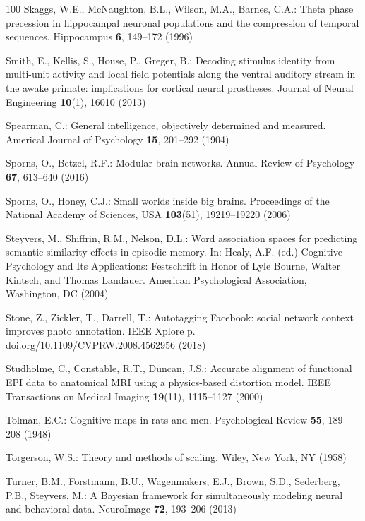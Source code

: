 \documentclass[runningheads]{llncs}
\begin{document}
\begin{thebibliography}{100}
Skaggs, W.E., Mc{N}aughton, B.L., Wilson, M.A., Barnes, C.A.: Theta phase
  precession in hippocampal neuronal populations and the compression of
  temporal sequences. Hippocampus  \textbf{6},  149--172 (1996)

Smith, E., Kellis, S., House, P., Greger, B.: Decoding stimulus identity from
  multi-unit activity and local field potentials along the ventral auditory
  stream in the awake primate: implications for cortical neural prostheses.
  Journal of Neural Engineering  \textbf{10}(1),  16010 (2013)

Spearman, C.: General intelligence, objectively determined and measured.
  Americal Journal of Psychology  \textbf{15},  201--292 (1904)

Sporns, O., Betzel, R.F.: Modular brain networks. Annual Review of Psychology
  \textbf{67},  613--640 (2016)

Sporns, O., Honey, C.J.: Small worlds inside big brains. Proceedings of the
  National Academy of Sciences, {USA}  \textbf{103}(51),  19219--19220 (2006)

Steyvers, M., Shiffrin, R.M., Nelson, D.L.: Word association spaces for
  predicting semantic similarity effects in episodic memory. In: Healy, A.F.
  (ed.) Cognitive Psychology and Its Applications: Festschrift in Honor of Lyle
  Bourne, {Walter} {Kintsch}, and {Thomas} {Landauer}. {American} Psychological
  Association, Washington, {DC} (2004)

Stone, Z., Zickler, T., Darrell, T.: Autotagging {Facebook}: social network
  context improves photo annotation. {IEEE} {Xplore} p.
  doi.org/10.1109/CVPRW.2008.4562956 (2018)

Studholme, C., Constable, R.T., Duncan, J.S.: Accurate alignment of functional
  {EPI} data to anatomical {MRI} using a physics-based distortion model. {IEEE}
  Transactions on Medical Imaging  \textbf{19}(11),  1115--1127 (2000)

Tolman, E.C.: Cognitive maps in rats and men. Psychological Review
  \textbf{55},  189--208 (1948)

Torgerson, W.S.: Theory and methods of scaling. Wiley, New York, {NY} (1958)

Turner, B.M., Forstmann, B.U., Wagenmakers, E.J., Brown, S.D., Sederberg, P.B.,
  Steyvers, M.: A {B}ayesian framework for simultaneously modeling neural and
  behavioral data. {NeuroImage}  \textbf{72},  193--206 (2013)


\end{thebibliography}
\end{document}
